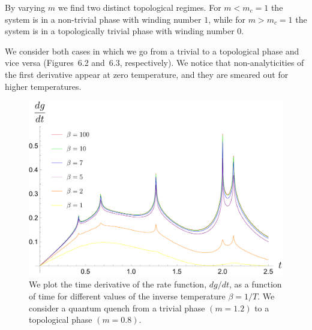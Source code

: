 By varying $m$ we find two distinct topological regimes. For $m<m_c=1$ the system is in a non-trivial phase with winding number $1$, while for $m>m_c=1$ the system is in a topologically trivial phase with winding number $0$.

We consider both cases in which we go from a trivial to a topological phase and vice versa (Figures~6.2 and~6.3, respectively). We notice that non-analyticities of the first derivative appear at zero temperature, and they are smeared out for higher temperatures.

\begin{figure}[h]
\begin{center}
\includegraphics[scale=0.3]{SSH_trivial_to_topological.pdf}
\caption{We plot the time derivative of the rate function, $dg/dt$, as a function of time for different values of the inverse temperature $\beta=1/T$. We consider a quantum quench from a trivial phase $(m=1.2)$ to a topological phase $(m=0.8)$.}
\end{center}  
\label{fig:SSHtrivialtopological}
\end{figure}


